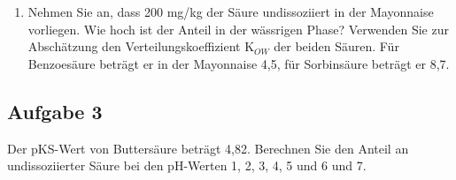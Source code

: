 \documentclass[a4paper,11pt]{article}
\newif\ifshowme
\begin{document}
\begin{enumerate}[label=\alph*)]
{}
\else
\fi

\item Nehmen Sie an, dass 200 mg/kg der Säure undissoziiert in der Mayonnaise vorliegen.
Wie hoch ist der Anteil in der wässrigen Phase? Verwenden Sie zur Abschätzung den
Verteilungskoeffizient K$_{OW}$ der beiden Säuren. Für Benzoesäure beträgt er in der
Mayonnaise 4,5, für Sorbinsäure beträgt er 8,7.

\ifshowme
\antwort{
%
%
\begin{align*}
K= 4,5 &= \frac{\frac{200~\text{mg}-x}{350}}{\frac{x}{650~\text{g}}} \\
4,5 &= \frac{200~\text{mg}-x}{350~\text{g}} \cdot \frac{650~\text{g}}{x}  \\
4,5 &= \frac{650}{350} \cdot (\frac{200~\text{mg}}{x}-1) \\ 
4,5 \cdot \frac{350}{650} &= \frac{200~\text{mg}}{x} -1 \\
(4,5 \cdot \frac{350}{650}+1) &= \frac{200~\text{mg}}{x} \\
\frac{1}{4,5 \cdot \frac{350}{650} + 1} \cdot 200 ~\text{mg} &= x  \\
x &= 58,43  ~\text{mg}
\end{align*}

Bei gleicher Verfahrensweise erhält man für \textbf{Sorbinsäure} (Verteilungskoeffizient = 8,7) einen Anteil von 35 mg in der wässrigen Phase
}
\else
\fi



\end{enumerate}






\subsection*{Aufgabe 3}
Der pKS-Wert von Buttersäure beträgt 4,82. Berechnen Sie den Anteil an undissoziierter Säure
bei den pH-Werten 1, 2, 3, 4, 5 und 6 und 7.
\end{document}
